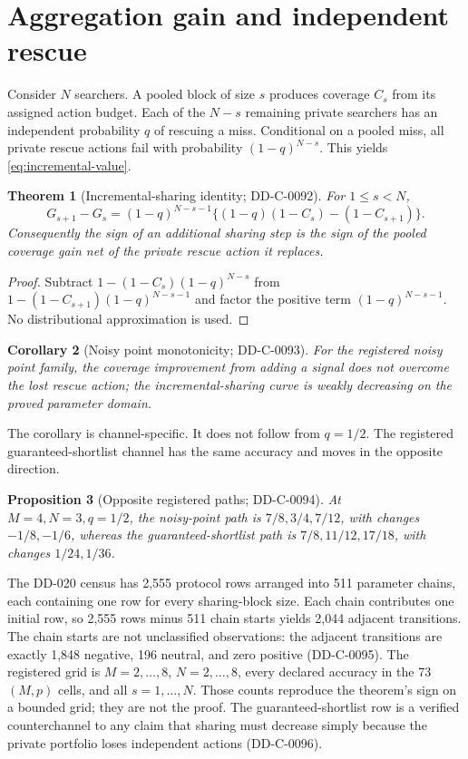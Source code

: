 \documentclass[12pt]{article}
\newtheorem{theorem}{Theorem}
\newtheorem{proposition}[theorem]{Proposition}
\newtheorem{corollary}[theorem]{Corollary}
\theoremstyle{definition}
\begin{document}
\section{Aggregation gain and independent rescue}

Consider $N$ searchers. A pooled block of size $s$ produces coverage $C_s$ from
its assigned action budget. Each of the $N-s$ remaining private searchers has an
independent probability $q$ of rescuing a miss. Conditional on a pooled miss,
all private rescue actions fail with probability $(1-q)^{N-s}$. This yields
\cref{eq:incremental-value}.

\begin{theorem}[Incremental-sharing identity; DD-C-0092]
For $1\leq s<N$,
\[
 G_{s+1}-G_s=(1-q)^{N-s-1}\{(1-q)(1-C_s)-(1-C_{s+1})\}.
\]
Consequently the sign of an additional sharing step is the sign of the pooled
coverage gain net of the private rescue action it replaces.
\end{theorem}

\begin{proof}
Subtract $1-(1-C_s)(1-q)^{N-s}$ from
$1-(1-C_{s+1})(1-q)^{N-s-1}$ and factor the positive term
$(1-q)^{N-s-1}$. No distributional approximation is used.
\end{proof}

\begin{corollary}[Noisy point monotonicity; DD-C-0093]
For the registered noisy point family, the coverage improvement from adding a
signal does not overcome the lost rescue action; the incremental-sharing curve
is weakly decreasing on the proved parameter domain.
\end{corollary}

The corollary is channel-specific. It does not follow from $q=1/2$. The
registered guaranteed-shortlist channel has the same accuracy and moves in the
opposite direction.




\begin{proposition}[Opposite registered paths; DD-C-0094]
At $M=4,N=3,q=1/2$, the noisy-point path is
$7/8,3/4,7/12$, with changes $-1/8,-1/6$, whereas the
guaranteed-shortlist path is $7/8,11/12,17/18$, with changes
$1/24,1/36$.
\end{proposition}

The DD-020 census has 2,555 protocol rows arranged into 511 parameter chains,
each containing one row for every sharing-block size. Each chain contributes
one initial row, so 2,555 rows minus 511 chain starts yields 2,044 adjacent
transitions. The chain starts are not unclassified observations: the adjacent
transitions are exactly 1,848
negative, 196 neutral, and zero positive (DD-C-0095). The registered grid is
$M=2,\ldots,8$, $N=2,\ldots,8$, every declared accuracy in the 73 $(M,p)$
cells, and all $s=1,\ldots,N$. Those counts reproduce the theorem's sign on a
bounded grid; they are not the proof.
The guaranteed-shortlist row is a verified counterchannel to any claim that
sharing must decrease simply because the private portfolio loses independent
actions (DD-C-0096).
\end{document}
